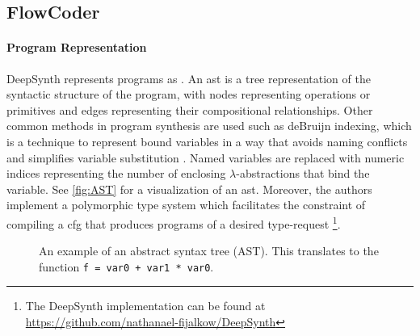 \subsection{FlowCoder}

\paragraph*{Program Representation} DeepSynth represents programs as . An \acrshort{ast} is a tree representation of the syntactic structure of the program, with nodes representing operations or primitives and edges representing their compositional relationships. Other common methods in program synthesis are used such as deBruijn indexing, which is a technique to represent bound variables in a way that avoids naming conflicts and simplifies variable substitution \cite{debruijnLambdaCalculusNotation1972}. Named variables are replaced with numeric indices representing the number of enclosing $\lambda$-abstractions that bind the variable. See \autoref{fig:AST} for a visualization of an \acrshort{ast}. Moreover, the authors implement a polymorphic type system which facilitates the constraint of compiling a \acrshort{cfg} that produces programs of a desired type-request \footnote{The DeepSynth implementation can be found at \url{https://github.com/nathanael-fijalkow/DeepSynth}}.

\begin{figure}[H]
    \centering
    \caption{An example of an abstract syntax tree (AST). This translates to the function \texttt{f = var0 + var1 * var0}.}
    \label{fig:AST}
\end{figure}








        
